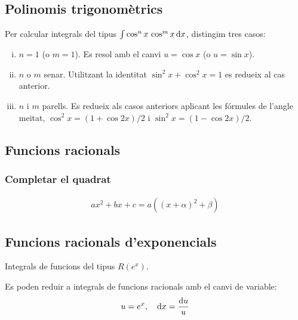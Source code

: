 \subsection{Polinomis trigonomètrics}
Per calcular integrals del tipus $\int \cos^{n} x \, \cos^{m} x \mathop{}\!\mathrm{d} x$, distingim tres casos:
\begin{enumerate}[i)]
    \item $n = 1$ (o $m = 1$). Es resol amb el canvi $u = \cos x$ (o $u = \sin x$).
    \item $n$ o $m$ senar. Utilitzant la identitat $\sin^{2} x + \cos^{2} x = 1$ es redueix al cas anterior.
    \item $n$ i $m$ parells. Es redueix als casos anteriors aplicant les fórmules de l'angle meitat, $\cos^{2} x = (1 + \cos 2x)/2$ i $\sin^{2} x = (1 - \cos 2x)/2$.
\end{enumerate}

\subsection{Funcions racionals}


\subsubsection*{Completar el quadrat}
\begin{align}
    a x^{2} + b x + c = a ((x + \alpha)^{2} + \beta )
\end{align}

\subsection{Funcions racionals d'exponencials}
Integrals de funcions del tipus $R(e^{x})$.

Es poden reduir a integrals de funcions racionals amb el canvi de variable:
\begin{align}
    u = e^{x}, \quad \mathrm{d} x = \frac{\mathrm{d} u}{u}
\end{align}

